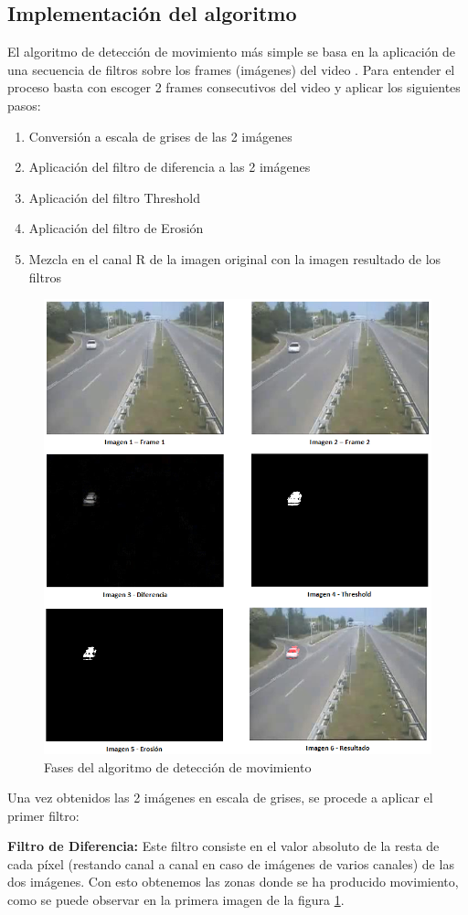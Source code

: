 \documentclass[twocolumn,twoside]{Jornadas}
\begin{document}
\subsection{Implementación del algoritmo}

El algoritmo de detección de movimiento más simple se basa en la aplicación de una secuencia de filtros sobre los frames (imágenes) del video \cite{codeproject}.
Para entender el proceso basta con escoger 2 frames consecutivos del video y aplicar los siguientes pasos:

\begin{enumerate}
   \item Conversión a escala de grises de las 2 imágenes
   \item Aplicación del filtro de diferencia a las 2 imágenes
   \item Aplicación del filtro Threshold
   \item Aplicación del filtro de Erosión
   \item Mezcla en el canal R de la imagen original con la imagen resultado de los filtros
\end{enumerate}

\begin{figure}
   \begin{center}
      \includegraphics[width=.5\textwidth]{joined.png}
      \caption{\label{fig:joined}Fases del algoritmo de detección de movimiento}
   \end{center}
\end{figure}

Una vez obtenidos las 2 imágenes en escala de grises, se procede a aplicar el primer filtro:

\textbf{Filtro de Diferencia:} Este filtro consiste en el valor absoluto de la resta de cada píxel (restando canal a canal en caso de imágenes de varios canales) de las dos imágenes. Con esto obtenemos las zonas donde se ha producido movimiento, como se puede observar en la primera imagen de la figura \ref{fig:joined}.
\end{document}
